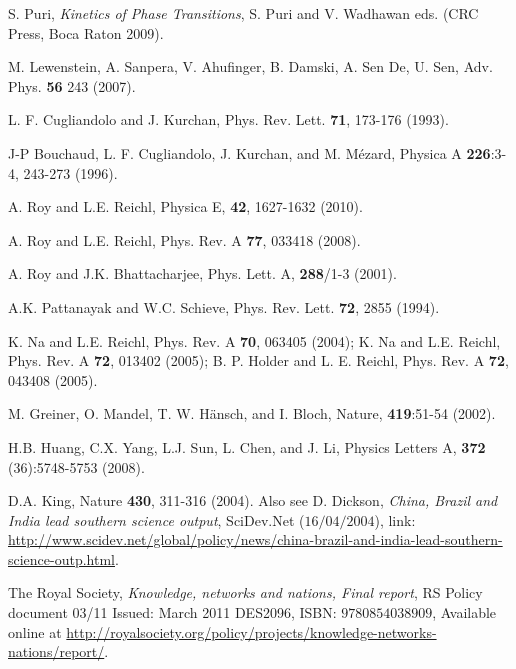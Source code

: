 \documentclass[a4paper,11pt,color]{article}
\renewenvironment{thebibliography}[1]{%
    \begin{oldthebibliography}{#1}%
      \setlength{\parskip}{0ex}%
      \setlength{\itemsep}{0ex}%
  }%
  {%
    \end{oldthebibliography}%
  }
\begin{document}
\begin{thebibliography}{}
S. Puri, \textit{Kinetics of Phase Transitions}, S. Puri and V. Wadhawan eds. (CRC Press, Boca Raton 2009).

M. Lewenstein, A. Sanpera, V. Ahufinger, B. Damski, A. Sen De, U. Sen, Adv. Phys. {\bf 56}
243 (2007).

L. F. Cugliandolo and J. Kurchan,  Phys. Rev. Lett. {\bf 71}, 173-176 (1993).

J-P Bouchaud, L. F. Cugliandolo, J. Kurchan, and M. M\'ezard, Physica A {\bf 226}:3-4, 243-273 (1996).





A. Roy and L.E. Reichl,  Physica {E}, {\bf 42}, 1627-1632 (2010). 

A. Roy and L.E. Reichl,  Phys. Rev. {A} {\bf 77}, 033418 (2008).

A. Roy and J.K. Bhattacharjee, Phys. Lett. {A}, {\bf 288}/1-3 (2001).

A.K. Pattanayak and W.C. Schieve, Phys. Rev. Lett. {\bf 72}, 2855 (1994).

K. Na and L.E. Reichl, Phys. Rev. A {\bf 70}, 063405 (2004); K. Na and L.E. Reichl, Phys. Rev. A {\bf 72}, 013402 (2005); B. P. Holder and L. E. Reichl, Phys. Rev. A {\bf 72}, 043408 (2005).

M. Greiner, O. Mandel, T. W. H\"ansch, and I. Bloch, Nature, {\bf 419}:51-54 (2002).

H.B. Huang, C.X. Yang, L.J. Sun, L. Chen, and J. Li, Physics Letters A, {\bf 372} (36):5748-5753 (2008).


D.A. King, Nature {\bf 430}, 311-316 (2004). Also see D. Dickson, \textit{China, Brazil and India lead southern science output}, SciDev.Net ($16/04/2004$), link: \url{http://www.scidev.net/global/policy/news/china-brazil-and-india-lead-southern-science-outp.html}.

The Royal Society, \textit{Knowledge, networks and nations, Final report}, RS Policy document 03/11
Issued: March 2011 DES2096, ISBN: $9780854038909$, Available online at \url{http://royalsociety.org/policy/projects/knowledge-networks-nations/report/}.
\end{thebibliography}
\end{document}

